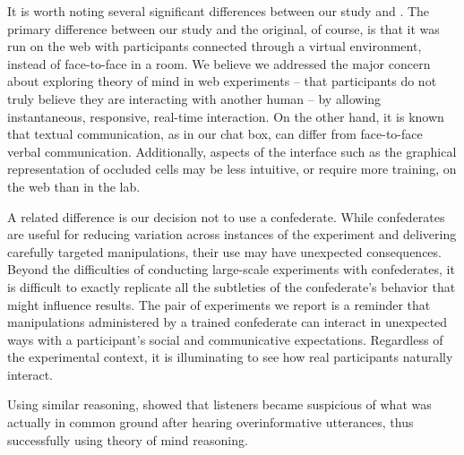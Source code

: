 \documentclass[manuscript]{stjour}
\begin{document}

It is worth noting several significant differences between our study and \cite{KeysarLinBarr03_LimitsOnTheoryOfMindUse}.
The primary difference between our study and the original, of course, is that it was run on the web with participants connected through a virtual environment, instead of face-to-face in a room. We believe we addressed the major concern about exploring theory of mind in web experiments -- that participants do not truly believe they are interacting with another human -- by allowing instantaneous, responsive, real-time interaction.  On the other hand, it is known that textual communication, as in our chat box, can differ from face-to-face verbal communication. Additionally, aspects of the interface such as the graphical representation of occluded cells may be less intuitive, or require more training, on the web than in the lab. %

A related difference is our decision not to use a confederate. While confederates are useful for reducing variation across instances of the experiment and delivering carefully targeted manipulations, their use may have unexpected consequences. Beyond the difficulties of conducting large-scale experiments with confederates, it is difficult to exactly replicate all the subtleties of the confederate's behavior that might influence results. The pair of experiments we report is a reminder that manipulations administered by a trained confederate can interact in unexpected ways with a participant's social and communicative expectations. Regardless of the experimental context, it is illuminating to see how real participants naturally interact.

Using similar reasoning, \cite{RubioFernandez16_DirectorTaskAttention} showed that listeners became suspicious of what was actually in common ground after hearing overinformative utterances, thus successfully using theory of mind reasoning. 

\end{document}
